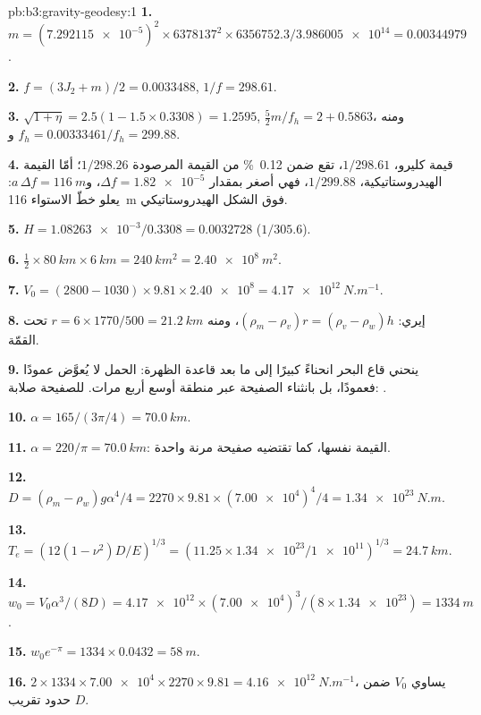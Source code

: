 \begin{solution}{pb:b3:gravity-geodesy:1}
\textbf{1.} $m = (\num{7.292115e-5})^2\times6378137^2\times6356752.3/
\num{3.986005e14} = \num{0.00344979}$.

\textbf{2.} $f = (3J_2 + m)/2 = \num{0.0033488}$, $1/f = 298.61$.

\textbf{3.} $\sqrt{1 + \eta} = 2.5(1 - 1.5\times0.3308) = 1.2595$,
$\tfrac52m/f_h = 2 + 0.5863$، ومنه $f_h = \num{0.0033346}$ و$1/f_h = 299.88$.

\textbf{4.} قيمة كليرو، $1/298.61$، تقع ضمن \qty{0.12}{\percent} من
القيمة المرصودة $1/298.26$؛ أمّا القيمة الهيدروستاتيكية، $1/299.88$، فهي أصغر بمقدار
$\Delta f = \num{1.82e-5}$، و$a\,\Delta f = \qty{116}{m}$: يعلو خطّ الاستواء
\qty{116}{m} فوق الشكل الهيدروستاتيكي.

\textbf{5.} $H = \num{1.08263e-3}/0.3308 = \num{0.0032728}$ ($1/305.6$).

\textbf{6.} $\tfrac12\times\qty{80}{km}\times\qty{6}{km} = \qty{240}{km^2} =
\qty{2.40e8}{m^2}$.

\textbf{7.} $V_0 = (2800 - 1030)\times9.81\times\num{2.40e8} =
\qty{4.17e12}{N.m^{-1}}$.

\textbf{8.} إيري: $(\rho_m - \rho_v)r = (\rho_v - \rho_w)h$، ومنه $r =
6\times1770/500 = \qty{21.2}{km}$ تحت القمّة.

\textbf{9.} ينحني قاع البحر انحناءً كبيرًا إلى ما بعد قاعدة الظهرة:
الحمل لا يُعوَّض عمودًا فعمودًا، بل بانثناء الصفيحة عبر
منطقة أوسع أربع مرات. للصفيحة صلابة: .

\textbf{10.} $\alpha = 165/(3\pi/4) = \qty{70.0}{km}$.

\textbf{11.} $\alpha = 220/\pi = \qty{70.0}{km}$: القيمة نفسها، كما تقتضيه صفيحة
مرنة واحدة.

\textbf{12.} $D = (\rho_m - \rho_w)g\alpha^4/4 = 2270\times9.81\times(\num{7.00e4})^4/4
= \qty{1.34e23}{N.m}$.

\textbf{13.} $T_e = (12(1 - \nu^2)D/E)^{1/3} = (11.25\times\num{1.34e23}/
\num{1e11})^{1/3} = \qty{24.7}{km}$.

\textbf{14.} $w_0 = V_0\alpha^3/(8D) = \num{4.17e12}\times(\num{7.00e4})^3/
(8\times\num{1.34e23}) = \qty{1334}{m}$.

\textbf{15.} $w_0e^{-\pi} = 1334\times0.0432 = \qty{58}{m}$.

\textbf{16.} $2\times1334\times\num{7.00e4}\times2270\times9.81 =
\qty{4.16e12}{N.m^{-1}}$، يساوي $V_0$ ضمن حدود تقريب $D$.


\end{solution}
